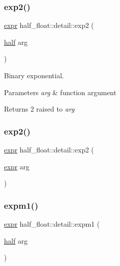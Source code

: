 \subsubsection{\texorpdfstring{exp2()}{exp2()}\hspace{0.1cm}{\footnotesize\ttfamily [1/2]}}
{\footnotesize\ttfamily \hyperlink{structhalf__float_1_1detail_1_1expr}{expr} half\+\_\+float\+::detail\+::exp2 (\begin{DoxyParamCaption}\item[{\hyperlink{classhalf__float_1_1half}{half}}]{arg }\end{DoxyParamCaption})\hspace{0.3cm}{\ttfamily [inline]}}

Binary exponential. 
\begin{DoxyParams}{Parameters}
{\em arg} & function argument \\
\hline
\end{DoxyParams}
\begin{DoxyReturn}{Returns}
2 raised to {\itshape arg} 
\end{DoxyReturn}
\mbox{\label{namespacehalf__float_1_1detail_aacebd17acf9b67ae3748ea3461d3cfad}} 
\subsubsection{\texorpdfstring{exp2()}{exp2()}\hspace{0.1cm}{\footnotesize\ttfamily [2/2]}}
{\footnotesize\ttfamily \hyperlink{structhalf__float_1_1detail_1_1expr}{expr} half\+\_\+float\+::detail\+::exp2 (\begin{DoxyParamCaption}\item[{\hyperlink{structhalf__float_1_1detail_1_1expr}{expr}}]{arg }\end{DoxyParamCaption})\hspace{0.3cm}{\ttfamily [inline]}}

\mbox{\label{namespacehalf__float_1_1detail_a7b50ad39eee026747f621d17eb982d47}} 
\subsubsection{\texorpdfstring{expm1()}{expm1()}\hspace{0.1cm}{\footnotesize\ttfamily [1/2]}}
{\footnotesize\ttfamily \hyperlink{structhalf__float_1_1detail_1_1expr}{expr} half\+\_\+float\+::detail\+::expm1 (\begin{DoxyParamCaption}\item[{\hyperlink{classhalf__float_1_1half}{half}}]{arg }\end{DoxyParamCaption})\hspace{0.3cm}{\ttfamily [inline]}}

